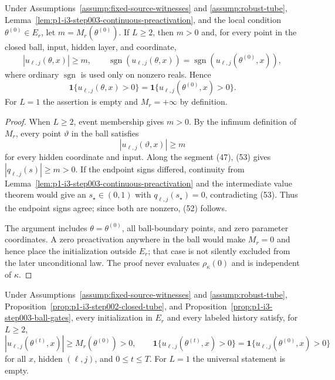 \begin{proposition}
\label{prop:p1-i3-step003-ball-gates}
Under Assumptions~\ref{assump:fixed-source-witnesses} and
\ref{assump:robust-tube}, Lemma~\ref{lem:p1-i3-step003-continuous-preactivation},
and the local condition $\theta^{(0)}\in E_r$, let
$m=M_r(\theta^{(0)})$.  If $L\geq2$, then $m>0$ and, for every point in the
closed ball, input, hidden layer, and coordinate,
\[
|u_{\ell,j}(\theta,x)|\geq m,
\qquad
\operatorname{sgn}(u_{\ell,j}(\theta,x))
=\operatorname{sgn}(u_{\ell,j}(\theta^{(0)},x)),
\tag{51}
\]
where ordinary $\operatorname{sgn}$ is used only on nonzero reals.  Hence
\[
\mathbf1\{u_{\ell,j}(\theta,x)>0\}
=\mathbf1\{u_{\ell,j}(\theta^{(0)},x)>0\}.
\tag{52}
\]
For $L=1$ the assertion is empty and $M_r=+\infty$ by definition.
\end{proposition}

\begin{proof}
When $L\geq2$, event membership gives $m>0$.  By the infimum definition of
$M_r$, every point $\vartheta$ in the ball satisfies
\[
|u_{\ell,j}(\vartheta,x)|\geq m
\tag{53}
\]
for every hidden coordinate and input.  Along the segment (47), (53) gives
$|q_{\ell,j}(s)|\geq m>0$.  If the endpoint signs differed, continuity from
Lemma~\ref{lem:p1-i3-step003-continuous-preactivation} and the intermediate
value theorem would give an $s_\star\in(0,1)$ with
$q_{\ell,j}(s_\star)=0$, contradicting (53).  Thus the endpoint signs agree;
since both are nonzero, (52) follows.

The argument includes $\theta=\theta^{(0)}$, all ball-boundary points, and
zero parameter coordinates.  A zero preactivation anywhere in the ball would
make $M_r=0$ and hence place the initialization outside $E_r$; that case is
not silently excluded from the later unconditional law.  The proof never
evaluates $\rho_\kappa(0)$ and is independent of $\kappa$.
\end{proof}

\begin{proposition}
\label{prop:p1-i3-step003-history-gates}
Under Assumptions~\ref{assump:fixed-source-witnesses} and
\ref{assump:robust-tube}, Proposition~\ref{prop:p1-i3-step002-closed-tube},
and Proposition~\ref{prop:p1-i3-step003-ball-gates}, every initialization in
$E_r$ and every labeled history satisfy, for $L\geq2$,
\[
|u_{\ell,j}(\theta^{(t)},x)|
\geq M_r(\theta^{(0)})>0,
\qquad
\mathbf1\{u_{\ell,j}(\theta^{(t)},x)>0\}
=\mathbf1\{u_{\ell,j}(\theta^{(0)},x)>0\}
\tag{54}
\]
for all $x$, hidden $(\ell,j)$, and $0\leq t\leq T$.  For $L=1$ the
universal statement is empty.
\end{proposition}

